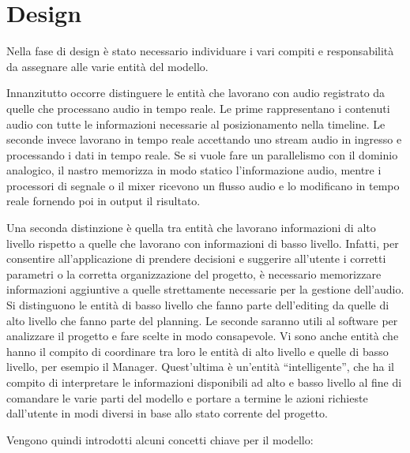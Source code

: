 \documentclass[a4paper,12pt]{report}
\begin{document}
\chapter{Design}
Nella fase di design è stato necessario individuare i vari compiti e responsabilità da assegnare alle varie entità del modello.

Innanzitutto occorre distinguere le entità che lavorano con audio registrato da quelle che processano audio in tempo reale.
Le prime rappresentano i contenuti audio con tutte le informazioni necessarie al posizionamento nella timeline. Le seconde invece lavorano in tempo reale accettando uno stream audio in ingresso e processando i dati in tempo reale.
Se si vuole fare un parallelismo con il dominio analogico, il nastro memorizza in modo statico l’informazione audio, mentre i processori di segnale o il mixer ricevono un flusso audio e lo modificano in tempo reale fornendo poi in output il risultato.

Una seconda distinzione è quella tra entità che lavorano informazioni di alto livello rispetto a quelle che lavorano con informazioni di basso livello.
Infatti, per consentire all’applicazione di prendere decisioni e suggerire all’utente i corretti parametri o la corretta organizzazione del progetto, è necessario memorizzare informazioni aggiuntive a quelle strettamente necessarie per la gestione dell’audio.
Si distinguono le entità di basso livello che fanno parte dell’editing da quelle di alto livello che fanno parte del planning. Le seconde saranno utili al software per analizzare il progetto e fare scelte in modo consapevole.
Vi sono anche entità che hanno il compito di coordinare tra loro le entità di alto livello e quelle di basso livello, per esempio il Manager.
Quest’ultima è un'entità “intelligente”, che ha il compito di interpretare le informazioni disponibili ad alto e basso livello al fine di comandare le varie parti del modello e portare a termine le azioni richieste dall’utente in modi diversi in base allo stato corrente del progetto.

\parskip 0.8in
Vengono quindi introdotti alcuni concetti chiave per il modello:
\parskip 0in
\end{document}
